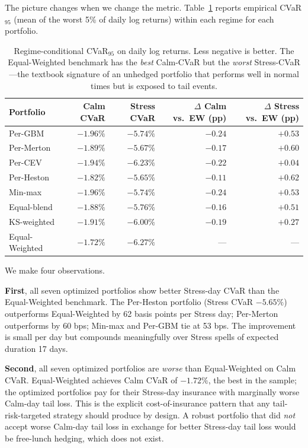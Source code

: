 \documentclass[11pt,letterpaper]{article}
\begin{document}
The picture changes when we change the metric. Table~\ref{tab:cvar} reports empirical CVaR$_{95}$ (mean of the worst 5\% of daily log returns) within each regime for each portfolio.

\begin{table}[h]
\centering
\caption{Regime-conditional CVaR$_{95}$ on daily log returns. Less negative is better. The Equal-Weighted benchmark has the \emph{best} Calm-CVaR but the \emph{worst} Stress-CVaR —the textbook signature of an unhedged portfolio that performs well in normal times but is exposed to tail events.}
\label{tab:cvar}
\begin{tabular}{lrrrr}
\toprule
Portfolio & Calm CVaR & Stress CVaR & $\Delta$ Calm vs.\ EW (pp) & $\Delta$ Stress vs.\ EW (pp) \\
\midrule
Per-GBM        & $-1.96\%$ & $-5.74\%$ & $-0.24$ & $+0.53$ \\
Per-Merton     & $-1.89\%$ & $-5.67\%$ & $-0.17$ & $+0.60$ \\
Per-CEV        & $-1.94\%$ & $-6.23\%$ & $-0.22$ & $+0.04$ \\
Per-Heston     & $-1.82\%$ & $-5.65\%$ & $-0.11$ & $+0.62$ \\
Min-max        & $-1.96\%$ & $-5.74\%$ & $-0.24$ & $+0.53$ \\
Equal-blend    & $-1.88\%$ & $-5.76\%$ & $-0.16$ & $+0.51$ \\
KS-weighted    & $-1.91\%$ & $-6.00\%$ & $-0.19$ & $+0.27$ \\
Equal-Weighted & $-1.72\%$ & $-6.27\%$ & ---     & --- \\
\bottomrule
\end{tabular}
\end{table}

We make four observations.

\textbf{First}, all seven optimized portfolios show better Stress-day CVaR than the Equal-Weighted benchmark. The Per-Heston portfolio (Stress CVaR $-5.65\%$) outperforms Equal-Weighted by 62 basis points per Stress day; Per-Merton outperforms by 60 bps; Min-max and Per-GBM tie at 53 bps. The improvement is small per day but compounds meaningfully over Stress spells of expected duration 17 days.

\textbf{Second}, all seven optimized portfolios are \emph{worse} than Equal-Weighted on Calm CVaR. Equal-Weighted achieves Calm CVaR of $-1.72\%$, the best in the sample; the optimized portfolios pay for their Stress-day insurance with marginally worse Calm-day tail loss. This is the explicit cost-of-insurance pattern that any tail-risk-targeted strategy should produce by design. A robust portfolio that did \emph{not} accept worse Calm-day tail loss in exchange for better Stress-day tail loss would be free-lunch hedging, which does not exist.
\end{document}
